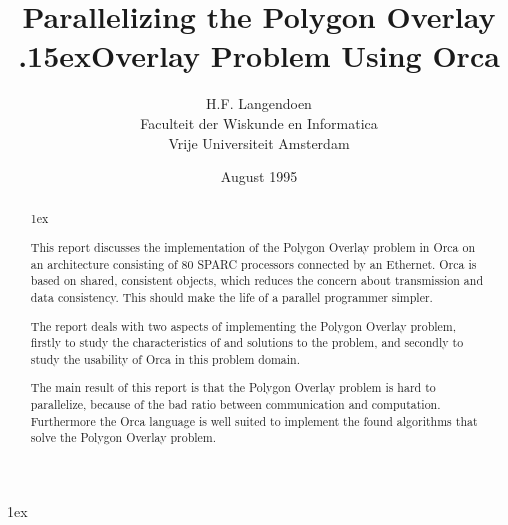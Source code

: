 
\title{
    {\bf Parallelizing the Polygon}
    Overlay \hspace{-7.5ex}\raise.15ex\hbox{Overlay}
    {\bf Problem Using Orca}
}
\author{
    H.F. Langendoen \\
    Faculteit der Wiskunde en Informatica\\
    Vrije Universiteit Amsterdam
}
\date{August 1995}




\newcommand{\newindex}[1]{\index{#1}#1}               %
\newcommand{\refAndCapt}[1]{\caption{#1}\label{#1}}   %
\newcommand{\refByCapt}[1]{Figure~\ref{#1}}           %
\newcommand{\sectionLabel}[1]{\section{#1}\label{#1}} %
\newcommand{\subsectionLabel}[1]{\subsection{#1}\label{#1}} %
\newcommand{\refSection}[1]{Section~\ref{#1}}         %

\maketitle

\parindent 0pt
\noindent
\parskip 1ex

\begin{abstract}
  \parindent 0pt
  \noindent
  \parskip 1ex
  \vspace{-4ex}

  This report discusses the implementation of the Polygon Overlay
  problem in Orca on an architecture consisting of 80 SPARC processors
  connected by an Ethernet.
  Orca is based on shared, consistent objects, which reduces the concern
  about transmission and data consistency.
  This should make the life of a parallel programmer simpler.

  The report deals with two aspects of implementing the Polygon Overlay
  problem,
  firstly to study the characteristics of and solutions to the problem,
  and secondly to study the usability of Orca in this problem domain.

  The main result of this report is that the Polygon Overlay problem
  is hard to parallelize, because of the bad ratio between communication
  and computation.
  Furthermore the Orca language is well suited to implement the found
  algorithms that solve the Polygon Overlay problem.

\end{abstract}







%

\newpage














